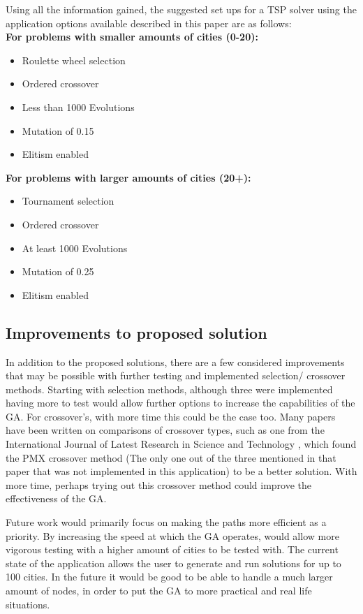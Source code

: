 \documentclass[article]{IEEEtran}
\begin{document}
Using all the information gained, the suggested set ups for a TSP solver using the application options available described in this paper are as follows:\\
\phantom{.}
\textbf{For problems with smaller amounts of cities (0-20):}
\begin{itemize}
\item Roulette wheel selection
\item Ordered crossover
\item Less than 1000 Evolutions
\item Mutation of 0.15
\item Elitism enabled
\end{itemize} 
\phantom{.}
\textbf{For problems with larger amounts of cities (20+):}
\begin{itemize}
\item Tournament selection
\item Ordered crossover
\item At least 1000 Evolutions
\item Mutation of 0.25
\item Elitism enabled
\end{itemize} 

\subsection{Improvements to proposed solution}
In addition to the proposed solutions, there are a few considered improvements that may be possible with further testing and implemented selection/ crossover methods. Starting with selection methods, although three were implemented having more to test would allow further options to increase the capabilities of the GA. For crossover's, with more time this could be the case too. Many papers have been written on comparisons of crossover types, such as one from the International Journal of Latest Research in Science and Technology \cite{14}, which found the PMX crossover method (The only one out of the three mentioned in that paper that was not implemented in this application) to be a better solution. With more time, perhaps trying out this crossover method could improve the effectiveness of the GA.\par
Future work would primarily focus on making the paths more efficient as a priority. By increasing the speed at which the GA operates, would allow more vigorous testing with a higher amount of cities to be tested with. The current state of the application allows the user to generate and run solutions for up to 100 cities. In the future it would be good to be able to handle a much larger amount of nodes, in order to put the GA to more practical and real life situations. \\
\end{document}
